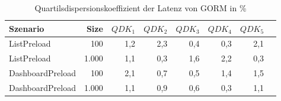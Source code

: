 
\begin{table}[ht]
\setlength{\extrarowheight}{-1pt}
\centering
\caption{Quartilsdispersionskoeffizient der Latenz von GORM in \%}
\begin{tabular}{lrrrrrrr}
\toprule
Szenario & Size & ${QDK_1}$ & ${QDK_2}$ & ${QDK_3}$& ${QDK_4}$ & ${QDK_5}$ \\
\midrule
	ListPreload & 100 & \cellcolor{red!2}  1,2 & \cellcolor{red!3}  2,3 & \cellcolor{red!1}  0,4 & \cellcolor{red!1}  0,3 & \cellcolor{red!3}  2,1 \\
	ListPreload & 1.000 & \cellcolor{red!2}  1,1 & \cellcolor{red!1}  0,3 & \cellcolor{red!2}  1,6 & \cellcolor{red!3}  2,2 & \cellcolor{red!1}  0,3 \\
	DashboardPreload & 100 & \cellcolor{red!3}  2,1 & \cellcolor{red!1}  0,7 & \cellcolor{red!1}  0,5 & \cellcolor{red!2}  1,4 & \cellcolor{red!2}  1,5 \\
	DashboardPreload & 1.000 & \cellcolor{red!2}  1,1 & \cellcolor{red!1}  0,9 & \cellcolor{red!1}  0,6 & \cellcolor{red!1}  0,3 & \cellcolor{red!2}  1,1 \\
\bottomrule
\end{tabular}
\label{tab:quartilsdispersionskoeffizient_latenz_gorm}
\end{table}
	